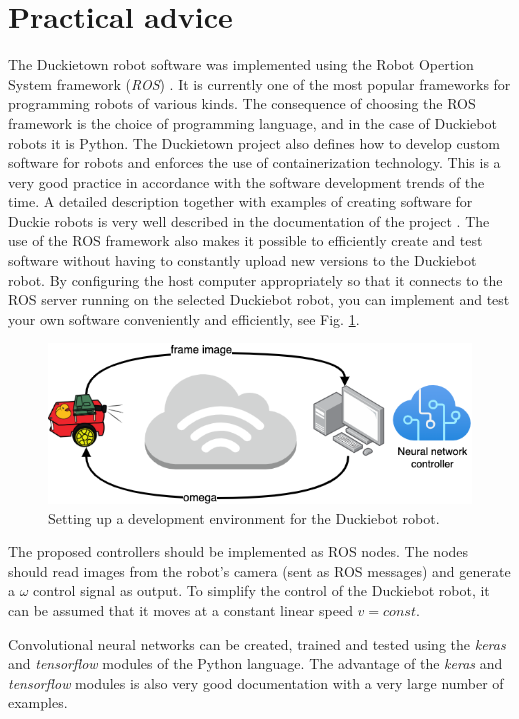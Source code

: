 \documentclass[conference]{IEEEtran}
\begin{document}
\section{Practical advice}\label{sec:practical-info}
The Duckietown robot software was implemented using the Robot Opertion System framework (\emph{ROS}) \cite{quigley2015programming}. It is currently one of the most popular frameworks for programming robots of various kinds. The consequence of choosing the ROS framework is the choice of programming language, and in the case of Duckiebot robots it is Python. The Duckietown project also defines how to develop custom software for robots and enforces the use of containerization technology. This is a very good practice in accordance with the software development trends of the time. A detailed description together with examples of creating software for Duckie robots is very well described in the documentation of the project \cite{Daniele:ff}. 
The use of the ROS framework also makes it possible to efficiently create and test software without having to constantly upload new versions to the Duckiebot robot. By configuring the host computer appropriately so that it connects to the ROS server running on the selected Duckiebot robot, you can implement and test your own software conveniently and efficiently, see Fig. \ref{fig:env-develop}.

\begin{figure}[h]
    \centering
    \includegraphics[width=.8\columnwidth]{controll_schema2}
    \caption{Setting up a development environment for the Duckiebot robot.}
    \label{fig:env-develop}
\end{figure}

The proposed controllers should be implemented as ROS nodes. The nodes should read images from the robot's camera (sent as ROS messages) and generate a $\omega$ control signal as output. To simplify the control of the Duckiebot robot, it can be assumed that it moves at a constant linear speed $v=const$.

Convolutional neural networks can be created, trained and tested using the \emph{keras} and \emph{tensorflow} modules of the Python language. The advantage of the \emph{keras} and \emph{tensorflow} modules is also very good documentation with a very large number of examples. 
\end{document}
